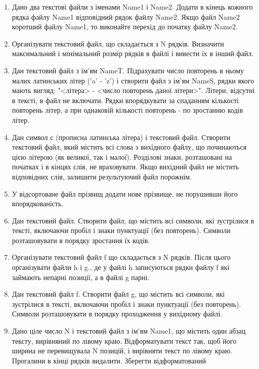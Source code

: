 \documentclass[]{article}
\begin{document}
\begin{enumerate}
\def\labelenumi{\arabic{enumi})}
\item
  Дано два текстові файли з іменами Name1 і Name2. Додати в кінець
  кожного рядка файлу Name1 відповідний рядок файлу Name2. Якщо файл
  Name2 коротший файлу Name1, то виконайте перехід до початку файлу
  Name2.
\item
  Організувати текстовий файл, що складається з N рядків. Визначити
  максимальний і мінімальний розмір рядків в файлі і вивести їх в інший
  файл.
\item
  Дан текстовий файл з ім'ям NameT. Підрахувати число повторень в ньому
  малих латинських літер ('a' - 'z') і створити файл з ім'ям NameS,
  рядки якого мають вигляд: "\textless{}літера\textgreater{} -
  \textless{}число повторень даної літери\textgreater{}". Літери,
  відсутні в тексті, в файл не включати. Рядки впорядкувати за спаданням
  кількості повторень літер, а при однаковій кількості повторень - по
  зростанню кодів літер.
\item
  Дан символ с (прописна латинська літера) і текстовий файл. Створити
  текстовий файл, який містить всі слова з вихідного файлу, що
  починаються цією літерою (як великої, так і малої). Розділові знаки,
  розташовані на початках і в кінцях слів, не враховувати. Якщо вихідний
  файл не містить відповідних слів, залишити результуючий файл порожнім.
\item
  У відсортоване файл прізвищ додати нове прізвище, не порушивши його
  впорядкованість.
\item
  Дан текстовий файл. Створити файл, що містить всі символи, які
  зустрілися в тексті, включаючи пробіл і знаки пунктуації (без
  повторень). Символи розташовувати в порядку зростання їх кодів.
\item
  Організувати текстовий файл f що складається з N рядків. Після цього
  організувати файли h і g., де у файлі h записуються рядки файлу f які
  займають непарні позиції, а в файлі g парні.
\item
  Дан текстовий файл f. Створити файл g, що містить всі символи, які
  зустрілися в тексті, включаючи пробіл і знаки пунктуації (без
  повторень). Символи розташовувати в порядку проходження у вихідному
  файлі.
\item
  Дано ціле число N і текстовий файл з ім'ям Name1, що містить один
  абзац тексту, вирівняний по лівому краю. Відформатувати текст так, щоб
  його ширина не перевищувала N позицій, і вирівняти текст по лівому
  краю. Прогалини в кінці рядків видалити. Зберегти відформатований

\end{enumerate}
\end{document}

